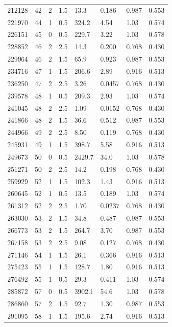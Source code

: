 \documentclass[preview]{standalone}
\begin{document}
{{{\begin{tabular}{L{1.2cm}C{1.2cm} C{0.3cm}C{0.5cm} C{1.4cm}C{1.4cm} C{1.4cm}C{1.4cm}}
  212128  &    42  & 2     & 1.5 &  13.3  & 0.186  & 0.987 &  0.553   \\ 
  221970  &    44  & 1     & 0.5 &  324.2  & 4.54  & 1.03 &  0.574   \\ 
  226151  &    45  & 0     & 0.5 &  229.7  & 3.22  & 1.03 &  0.578   \\ 
  228852  &    46  & 2     & 2.5 &  14.3  & 0.200  & 0.768 &  0.430   \\ 
  229964  &    46  & 2     & 1.5 &  65.9  & 0.923  & 0.987 &  0.553   \\ 
  234716  &    47  & 1     & 1.5 &  206.6  & 2.89  & 0.916 &  0.513   \\ 
  236250  &    47  & 2     & 2.5 &  3.26  & 0.0457  & 0.768 &  0.430   \\ 
  239578  &    48  & 1     & 0.5 &  209.3  & 2.93  & 1.03 &  0.574   \\ 
  241045  &    48  & 2     & 2.5 &  1.09  & 0.0152  & 0.768 &  0.430   \\ 
  241866  &    48  & 2     & 1.5 &  36.6  & 0.512  & 0.987 &  0.553   \\ 
  244966  &    49  & 2     & 2.5 &  8.50  & 0.119  & 0.768 &  0.430   \\ 
  245931  &    49  & 1     & 1.5 &  398.7  & 5.58  & 0.916 &  0.513   \\ 
  249673  &    50  & 0     & 0.5 &  2429.7  & 34.0  & 1.03 &  0.578   \\ 
  251271  &    50  & 2     & 2.5 &  14.2  & 0.198  & 0.768 &  0.430   \\ 
  259929  &    52  & 1     & 1.5 &  102.3  & 1.43  & 0.916 &  0.513   \\ 
  260645  &    52  & 1     & 0.5 &  13.5  & 0.189  & 1.03 &  0.574   \\ 
  261312  &    52  & 2     & 2.5 &  1.70  & 0.0237  & 0.768 &  0.430   \\ 
  263030  &    53  & 2     & 1.5 &  34.8  & 0.487  & 0.987 &  0.553   \\ 
  266773  &    53  & 2     & 1.5 &  264.7  & 3.70  & 0.987 &  0.553   \\ 
  267158  &    53  & 2     & 2.5 &  9.08  & 0.127  & 0.768 &  0.430   \\ 
  271146  &    54  & 1     & 1.5 &  26.1  & 0.366  & 0.916 &  0.513   \\ 
  275423  &    55  & 1     & 1.5 &  128.7  & 1.80  & 0.916 &  0.513   \\ 
  276492  &    55  & 1     & 0.5 &  29.3  & 0.411  & 1.03 &  0.574   \\ 
  285872  &    57  & 0     & 0.5 &  3902.1  & 54.6  & 1.03 &  0.578   \\ 
  286860  &    57  & 2     & 1.5 &  92.7  & 1.30  & 0.987 &  0.553   \\ 
  291095  &    58  & 1     & 1.5 &  195.6  & 2.74  & 0.916 &  0.513   \\ 
\hline 
\end{tabular} 

}}}
\end{document}
